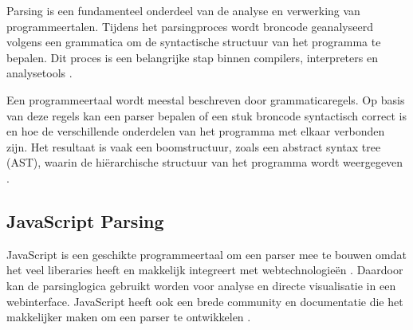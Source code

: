 Parsing is een fundamenteel onderdeel van de analyse en verwerking van programmeertalen. Tijdens het parsingproces wordt broncode geanalyseerd volgens een grammatica om de syntactische structuur van het programma te bepalen. Dit proces is een belangrijke stap binnen compilers, interpreters en analysetools \autocite{zaytsev_2020}.

Een programmeertaal wordt meestal beschreven door grammaticaregels. Op basis van deze regels kan een parser bepalen of een stuk broncode syntactisch correct is en hoe de verschillende onderdelen van het programma met elkaar verbonden zijn. Het resultaat is vaak een boomstructuur, zoals een abstract syntax tree (AST), waarin de hiërarchische structuur van het programma wordt weergegeven \autocite{sun_fang_miao_you_yuan_chen_zhang_guo_chen_liu_et_al._2023}. 

\subsection{JavaScript Parsing}

JavaScript is een geschikte programmeertaal om een parser mee te bouwen omdat het veel liberaries heeft en makkelijk integreert met webtechnologieën \autocite{mdn_contributors_2023}. Daardoor kan de parsinglogica gebruikt worden voor analyse en directe visualisatie in een webinterface. JavaScript heeft ook een brede community en documentatie die het makkelijker maken om een parser te ontwikkelen \autocite{mdn_contributors_2023}. 
